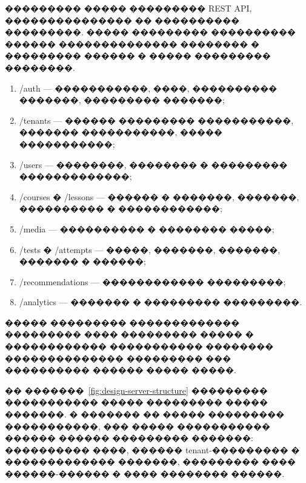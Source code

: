 ��������� ����� ��������� REST API, ��������������� �� ���������� ���������. ����� ��������� ���������� ������ �������������� �������� � ��������� ������ � ����� ��������� ��������.
\begin{enumerate}
  \item /auth --- �����������, ����, ���������� �������, ��������� �������;
  \item /tenants --- ������ ��������� �����������, ������� �����������, ����� �����������;
  \item /users --- ��������, �������� � ��������� �������������;
  \item /courses � /lessons --- ������ � �������, �������, ���������� � ������������;
  \item /media --- ���������� � �������� �����;
  \item /tests � /attempts --- �����, �������, �������, ������� � ������;
  \item /recommendations --- ������������ ���������;
  \item /analytics --- ������� � ��������� ���������.
\end{enumerate}

����� ��������� ������������� ��������� ���� ��������� ����� � ������������ ����������� �������� �������������� ��������� ��� ���������� ������ ����� �����.

�� �������~\ref{fig:design-server-structure} ��������� ����������� ����� ��������� ����� �������. � ������� �� ����� ��������� �����������, ��� ����� ����������� ������ ������ ��������� �������: ���������� ����, ������ tenant-��������� � ������������� �������, ��������� ���� ������-������ � ���� �������� ������.

